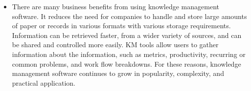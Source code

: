 \documentclass[12pt]{article}
\begin{document}
\begin{itemize}
\item There are many business benefits from using knowledge management software. It reduces the need for companies to handle and store large amounts of paper or records in various formats with various storage requirements. Information can be retrieved faster, from a wider variety of sources, and can be shared and controlled more easily. KM tools allow users to gather information about the information, such as metrics, productivity, recurring or common problems, and work flow breakdowns. For these reasons, knowledge management software continues to grow in popularity, complexity, and practical application.
\end{itemize}
\end{document}
